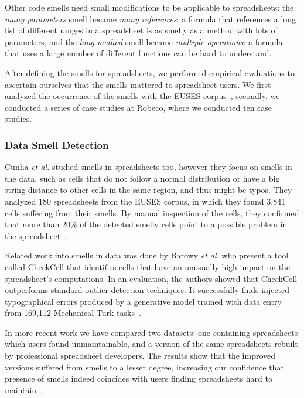 \documentclass[conference]{IEEEtran}
\begin{document}
Other code smells need small modifications to be applicable to spreadsheets: the \emph{many parameters} smell became \emph{many references}: a formula that references a long list of different ranges in a spreadsheet is as smelly as a method with lots of parameters, and the \emph{long method} smell became \emph{multiple operations}: a formula that uses a large number of different functions can be hard to understand.

After defining the smells for spreadsheets, we performed empirical evaluations to ascertain ourselves that the smells mattered to spreadsheet users. We first analyzed the occurrence of the smells with the EUSES corpus~\cite{fisher_euses_2005}, secondly, we conducted a series of case studies at Robeco, where we conducted ten case studies. 


\subsubsection{Data Smell Detection}
Cunha \emph{et al.} studied smells in spreadsheets too, however they focus on smells in the data, such as cells that do not follow a normal distribution or have a big string distance to other cells in the same region, and thus might be typos. They analyzed 180 spreadsheets from the EUSES corpus, in which they found 3,841 cells suffering from their smells. By manual inspection of the cells, they confirmed that more than 20\% of the detected smelly cells point to a possible problem in the spreadsheet~\cite{cunha_towards_2012}.

Related work into smells in data was done by Barowy \emph{et al.} who present a tool called CheckCell that identifies cells that have an unusually high impact on the spreadsheet’s computations. In an evaluation, the authors showed that CheckCell outperforms standard outlier detection techniques. It successfully finds injected typographical errors produced by a generative model trained with data entry from 169,112 Mechanical Turk tasks~\cite{barowy_checkcell:_2014}.



In more recent work we have compared two datasets: one containing spreadsheets which users found unmaintainable, and a version of the same spreadsheets rebuilt by professional spreadsheet developers. The results show that the improved versions suffered from smells to a lesser degree, increasing our confidence that presence of smells indeed coincides with users finding spreadsheets hard to maintain~\cite{Jansen2015}.
\end{document}
